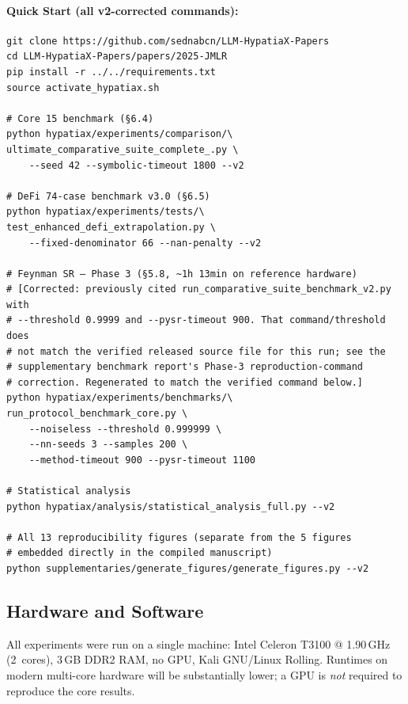 \documentclass[twoside,11pt]{article}
\begin{document}
\paragraph{Quick Start (all v2-corrected commands):}
\begin{small}
\begin{verbatim}
git clone https://github.com/sednabcn/LLM-HypatiaX-Papers
cd LLM-HypatiaX-Papers/papers/2025-JMLR
pip install -r ../../requirements.txt
source activate_hypatiax.sh

# Core 15 benchmark (§6.4)
python hypatiax/experiments/comparison/\
ultimate_comparative_suite_complete_.py \
    --seed 42 --symbolic-timeout 1800 --v2

# DeFi 74-case benchmark v3.0 (§6.5)
python hypatiax/experiments/tests/\
test_enhanced_defi_extrapolation.py \
    --fixed-denominator 66 --nan-penalty --v2

# Feynman SR — Phase 3 (§5.8, ~1h 13min on reference hardware)
# [Corrected: previously cited run_comparative_suite_benchmark_v2.py with
# --threshold 0.9999 and --pysr-timeout 900. That command/threshold does
# not match the verified released source file for this run; see the
# supplementary benchmark report's Phase-3 reproduction-command
# correction. Regenerated to match the verified command below.]
python hypatiax/experiments/benchmarks/\
run_protocol_benchmark_core.py \
    --noiseless --threshold 0.999999 \
    --nn-seeds 3 --samples 200 \
    --method-timeout 900 --pysr-timeout 1100

# Statistical analysis
python hypatiax/analysis/statistical_analysis_full.py --v2

# All 13 reproducibility figures (separate from the 5 figures
# embedded directly in the compiled manuscript)
python supplementaries/generate_figures/generate_figures.py --v2
\end{verbatim}
\end{small}

\subsection{Hardware and Software}

All experiments were run on a single machine: Intel Celeron T3100 @
1.90\,GHz (2~cores), 3\,GB DDR2 RAM, no GPU, Kali GNU/Linux Rolling.
Runtimes on modern multi-core hardware will be substantially lower; a GPU
is \emph{not} required to reproduce the core results.
\end{document}
